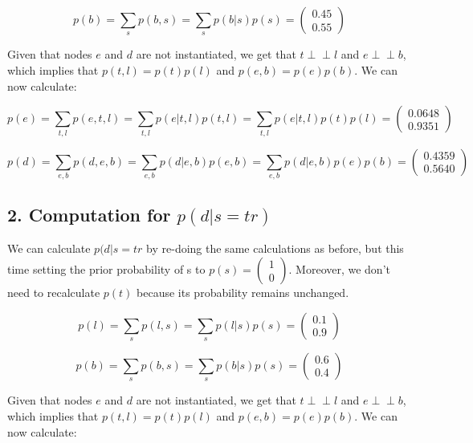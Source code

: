 \documentclass[11pt,a4paper,oneside]{report}
\newcommand\ci{\perp\!\!\!\perp} %
\begin{document}
$$p(b) = \sum_{s}p(b,s) = \sum_{s}p(b|s)p(s) = 
\begin{pmatrix}
   0.45\\
   0.55
\end{pmatrix}
$$

Given that nodes $e$ and $d$ are not instantiated, we get that $t \ci l$ and $e 
\ci b$, which implies that $p(t,l) = p(t)p(l)$ and $p(e,b)=p(e)p(b)$. We can 
now calculate:

$$p(e) = \sum_{t,l}p(e,t,l) = \sum_{t,l}p(e|t,l)p(t,l) = 
\sum_{t,l}p(e|t,l)p(t)p(l) = 
\begin{pmatrix}
   0.0648\\
   0.9351
\end{pmatrix}
$$

$$p(d) = \sum_{e,b}p(d,e,b) = \sum_{e,b}p(d|e,b)p(e,b) = 
\sum_{e,b}p(d|e,b)p(e)p(b) = 
\begin{pmatrix}
   0.4359\\
   0.5640
\end{pmatrix}
$$

\subsection*{2. Computation for $p(d|s = tr)$}

We can calculate $p(d| s = tr$ by re-doing the same calculations as 
before, but this time setting the prior probability of s to $p(s) = 
\begin{pmatrix}
                                                              1\\
                                                              0
                                                             \end{pmatrix}$. 
Moreover, we don't need to recalculate $p(t)$ because its probability remains 
unchanged.

$$p(l) = \sum_{s}p(l,s) = \sum_{s}p(l|s)p(s) = 
\begin{pmatrix}
   0.1\\
   0.9
\end{pmatrix}
$$

$$p(b) = \sum_{s}p(b,s) = \sum_{s}p(b|s)p(s) = 
\begin{pmatrix}
   0.6\\
   0.4
\end{pmatrix}
$$

Given that nodes $e$ and $d$ are not instantiated, we get that $t \ci l$ and $e 
\ci b$, which implies that $p(t,l) = p(t)p(l)$ and $p(e,b)=p(e)p(b)$. We can 
now calculate:
\end{document}
